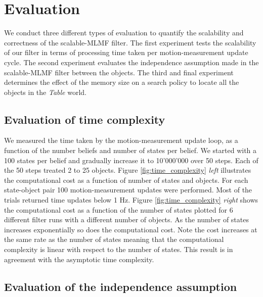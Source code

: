 \documentclass{frontiersSCNS} %
\begin{document}
\section{Evaluation}

We conduct three different types of evaluation to quantify the scalability and correctness of the scalable-MLMF filter. The first experiment
tests the scalability of our filter in terms of processing time taken per motion-measurement update cycle. The second experiment evaluates the independence 
assumption made in the scalable-MLMF filter between the objects. The third and final experiment determines the effect of the 
memory size on a search policy to locate all the objects in the \textit{Table} world.

\subsection{Evaluation of time complexity}

We measured the time taken by the motion-measurement update loop, as a function of the number beliefs and number of states per belief. 
We started with a 100 states per belief and gradually increase it to 10'000'000 over 50 steps. Each of the 50 steps treated 2 to 25  objects. 
Figure \ref{fig:time_complexity} \textit{left} illustrates the computational
cost as a function of number of states and objects. For each state-object pair 100 motion-measurement updates were performed. Most of the trials returned time updates 
below 1 Hz. Figure \ref{fig:time_complexity} \textit{right} shows the computational cost as a function of the number of states plotted for 6 different filter runs with
a different number of objects. As the number of states increases exponentially so does the computational cost. Note the cost increases at the same
rate as the number of states meaning that the computational complexity is linear with respect to the number of states. This result is in agreement with 
the asymptotic time complexity.



\subsection{Evaluation of the independence assumption}\label{subsec:eval_indep_assumptiom}
\end{document}

